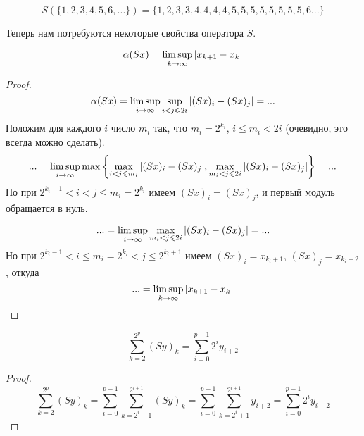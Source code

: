 \begin{example}
	$$
		S(\{1,2,3,4,5,6, ...\}) = \{1,2,3,3,4,4,4,4,5,5,5,5,5,5,5,5,6...\}
	$$
\end{example}

Теперь нам потребуются некоторые свойства оператора $S$.

\begin{lemma}
	\label{thm:alpha_S}
	\begin{equation}\label{alpha_S}
		\alpha(Sx) = \varlimsup_{k\to\infty} |x_{k+1} - x_{k}|
	\end{equation}
\end{lemma}

\begin{proof}
	\begin{equation*}
		\alpha(Sx) =
		\varlimsup_{i\to\infty} \sup_{i < j \leq 2i} | (Sx)_i - (Sx)_j | = ...
	\end{equation*}
	Положим для каждого $i$ число $m_i$ так,
	что $m_i = 2^{k_i}$, $i \leq m_i < 2i$
	(очевидно, это всегда можно сделать).
	\begin{equation*}
		... =
		\varlimsup_{i\to\infty} \max \left\{
			\max_{i   < j \leq m_i} | (Sx)_i - (Sx)_j |,
			\max_{m_i < j \leq 2i } | (Sx)_i - (Sx)_j |
		\right\} =
		...
	\end{equation*}
	Но при $2^{k_i - 1} < i < j \leq m_i = 2^{k_i}$
	имеем $(Sx)_i = (Sx)_j$, и первый модуль обращается в нуль.

	\begin{equation*}
		... =
		\varlimsup_{i\to\infty}
			\max_{m_i < j \leq 2i } | (Sx)_i - (Sx)_j |
		=
		...
	\end{equation*}
	Но при $2^{k_i - 1} < i \leq m_i = 2^{k_i} < j \leq 2^{k_i+1}$
	имеем $(Sx)_i = x_{k_i+1}$, $(Sx)_j = x_{k_i+2}$, откуда
	\begin{equation}\label{alpha_S_sosedi}
		... =
		\varlimsup_{k\to\infty}
			| x_{k+1} - x_k |
	\end{equation}
\end{proof}


\begin{lemma}
	\begin{equation}\label{summa_S_less}
		\sum_{k=2}^{2^p} (Sy)_k =
		\sum_{i=0}^{p-1} 2^i y_{i+2}
	\end{equation}
\end{lemma}

\begin{proof}
	\begin{equation*}
		\sum_{k=2}^{2^p} (Sy)_k =
		\sum_{i=0}^{p-1} \sum_{k=2^i+1}^{2^{i+1}} (Sy)_k =
		\sum_{i=0}^{p-1} \sum_{k=2^i+1}^{2^{i+1}} y_{i+2} =
		\sum_{i=0}^{p-1} 2^i y_{i+2}
	\end{equation*}
\end{proof}



